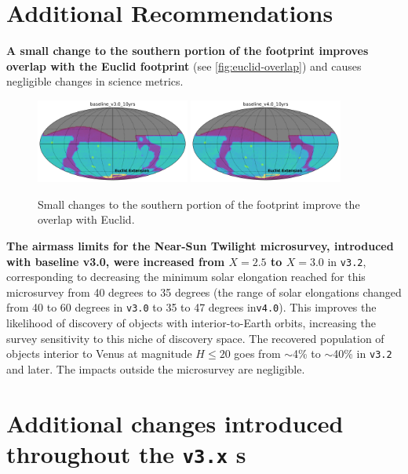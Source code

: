 \section{Additional Recommendations}\label{sec:additional}

{\bf A small change to the southern portion of the footprint improves overlap with the Euclid footprint} (see \autoref{fig:euclid-overlap}) and causes negligible changes in science metrics. 
\begin{figure}
\centering
\includegraphics[width=0.45\textwidth]{figures/baseline_v3_0_10yrs_euclid_overlap.png}
\includegraphics[width=0.45\textwidth]{figures/baseline_v4_0_10yrs_euclid_overlap.png}

\caption{Small changes to the southern portion of the footprint improve the overlap with Euclid. \label{fig:euclid-overlap}}
\end{figure}

{\bf The airmass limits for the Near-Sun Twilight microsurvey, introduced with baseline v3.0, were increased from $X=2.5$ to $X=3.0$} in \texttt{v3.2}, corresponding to decreasing the minimum solar elongation reached for this microsurvey from 40 degrees to 35 degrees (the range of solar elongations changed from 40 to 60 degrees in \texttt{v3.0} to 35 to 47 degrees in\texttt{v4.0}). This improves the likelihood of discovery of objects with interior-to-Earth orbits, increasing the survey sensitivity to this niche of discovery space. The recovered population of objects
interior to Venus at magnitude $H\leq20$ goes from \mbox{$\sim$4\%} to \mbox{$\sim$40\%} in \texttt{v3.2} and later. The impacts outside the microsurvey are negligible.

\clearpage

\section{Additional changes introduced throughout the \texttt{v3.x} \opsim s } \label{sec:opsimchanges}

